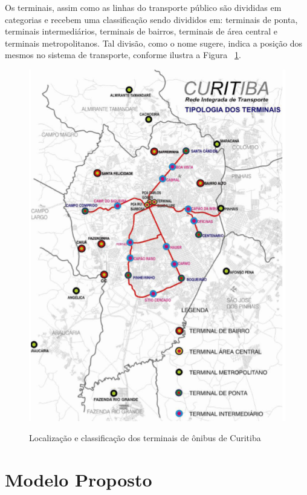 Os terminais, assim como as linhas do transporte público são divididas em categorias e  recebem uma classificação sendo divididos em: terminais de ponta, terminais intermediários, terminais de bairros, terminais de área central e terminais metropolitanos. Tal divisão, como o nome sugere, indica a posição dos mesmos no sistema de transporte, conforme ilustra a Figura ~\ref{fig:terminais}.
 \begin{figure}[!h]
 \caption{Localização e classificação dos terminais de ônibus de Curitiba}
     \centering
     \includegraphics[scale=.95]{./Capitulo3/img/terminais.png}
         \label{fig:terminais}
 \end{figure}

\section{Modelo Proposto} \label{sec:met}


